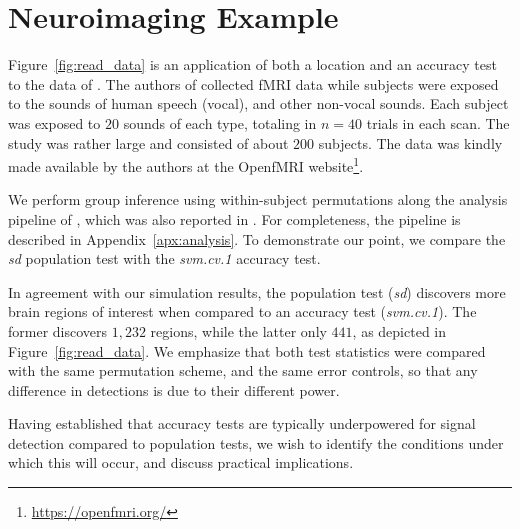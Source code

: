 \documentclass[12pt,a4paper]{article}
\theoremstyle{definition}
\begin{document}
\section{Neuroimaging Example}
\label{sec:example}

Figure~\ref{fig:read_data} is an application of both a location and an accuracy test to the data of \cite{pernet_human_2015}. 
The authors of \cite{pernet_human_2015} collected fMRI data while subjects were exposed to the sounds of human speech (vocal), and other non-vocal sounds. 
Each subject was exposed to $20$ sounds of each type, totaling in $n=40$ trials in each scan.
The study was rather large and consisted of about $200$ subjects.
The data was kindly made available by the authors at the OpenfMRI website\footnote{\url{https://openfmri.org/}}.

We perform group inference using within-subject permutations along the analysis pipeline of \cite{stelzer_statistical_2013}, which was also reported in \cite{gilron_quantifying_2016}. 
For completeness, the pipeline is described in Appendix~\ref{apx:analysis}. 
To demonstrate our point, we compare the \emph{sd} population test with the \emph{svm.cv.1} accuracy test. 

In agreement with our simulation results, the population test (\emph{sd}) discovers more brain regions of interest when compared to an accuracy test (\emph{svm.cv.1}).
The former discovers $1,232$ regions, while the latter only $441$, as depicted in Figure~\ref{fig:read_data}.
We emphasize that both test statistics were compared with the same permutation scheme, and the same error controls, so that any difference in detections is due to their different power.

Having established that accuracy tests are typically underpowered for signal detection compared to population tests, we wish to identify the conditions under which this will occur, and discuss practical implications. 
\end{document}
